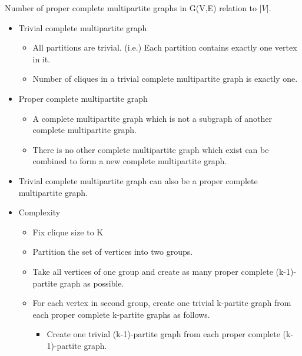 \documentclass[landscape]{slides}
\begin{document}
\begin{slide}
	\begin{center}
		Number of proper complete multipartite graphs in G(V,E) relation to $|V|$.
	\end{center}
	\begin{itemize}
		\setlength{\itemsep}{0pt}
		\setlength{\parskip}{5pt}
		\setlength{\parsep}{0pt}
		\item Trivial complete multipartite graph
		\begin{itemize}
			\setlength{\itemsep}{0pt}
			\setlength{\parskip}{00pt}
			\setlength{\parsep}{0pt}
			\item All partitions are trivial. (i.e.) Each partition contains exactly one vertex in it.
			\item Number of cliques in a trivial complete multipartite graph is exactly one.
		\end{itemize}
		\item Proper complete multipartite graph
		\begin{itemize}
			\setlength{\itemsep}{0pt}
			\setlength{\parskip}{00pt}
			\setlength{\parsep}{0pt}
			\item A complete multipartite graph which is not a subgraph of another complete multipartite graph.
			\item There is no other complete multipartite graph which exist can be combined to form a new complete multipartite graph.
		\end{itemize}
		\item Trivial complete multipartite graph can also be a proper complete multipartite graph.
		\item Complexity
		\begin{itemize}
			\setlength{\itemsep}{0pt}
			\setlength{\parskip}{00pt}
			\setlength{\parsep}{0pt}
			\item Fix clique size to K
			\item Partition the set of vertices into two groups.
			\item Take all vertices of one group and create as many proper complete (k-1)-partite graph as possible.
			\item For each vertex in second group, create one trivial k-partite graph from each proper complete k-partite graphs as follows.
			\begin{itemize}
				\setlength{\itemsep}{0pt}
				\setlength{\parskip}{00pt}
				\setlength{\parsep}{0pt}
				\item Create one trivial (k-1)-partite graph from each proper complete (k-1)-partite graph.

\end{itemize}
\end{itemize}
\end{itemize}
\end{slide}
\end{document}
